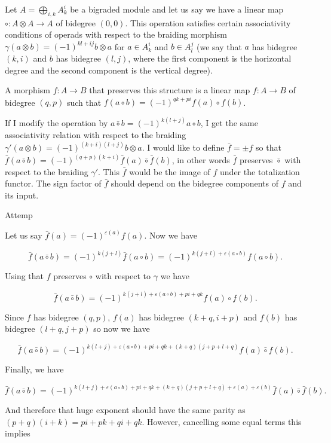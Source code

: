 \documentclass[twoside]{article}
\begin{document}
Let $A=\bigoplus_{i,k} A^i_k$ be a bigraded module and let us say we have a linear map $\circ :A\otimes A\to A$ of bidegree $(0,0)$. This operation satisfies certain associativity conditions of operads with respect to the braiding morphism $\gamma(a\otimes b)=(-1)^{kl+ij}b\otimes a$ for $a\in A^i_k$ and $b\in A^j_l$ (we say that $a$ has bidegree $(k,i)$ and $b$ has bidegree $(l,j)$, where the first component is the horizontal degree and the second component is the vertical degree). 

A morphism $f:A\to B$ that preserves this structure is a linear map $f:A\to B$ of bidegree $(q,p)$ such that $f(a\circ b)=(-1)^{qk+pi}f(a)\circ f(b)$.



If I modify the operation by $a\bar{\circ}b=(-1)^{k(l+j)}a\circ b$, I get the same associativity relation with respect to the braiding $\gamma'(a\otimes b)=(-1)^{(k+i)(l+j)}b\otimes a$. I would like to define $\bar{f}=\pm f$ so that $\bar{f}(a\bar{\circ}b)=(-1)^{(q+p)(k+i)}\bar{f}(a)\bar{\circ}\bar{f}(b)$, in other words $\bar{f}$ preserves $\bar{\circ}$ with respect to the braiding $\gamma'$. This $\bar{f}$ would be the image of $f$ under the totalization functor. The sign factor of $\bar{f}$ should depend on the bidegree components of $f$ and its input.


Attemp

Let us say $\bar{f}(a)=(-1)^{\varepsilon(a)}f(a)$. Now we have

$$\bar{f}(a\bar{\circ} b)=(-1)^{k(j+l)}\bar{f}(a\circ b)=(-1)^{k(j+l)+\varepsilon(a\circ b)}f(a\circ b).$$

Using that $f$ preserves $\circ$ with respect to $\gamma$ we have

$$\bar{f}(a\bar{\circ} b)=(-1)^{k(j+l)+\varepsilon(a\circ b)+pi+qk}f(a)\circ f(b).$$

Since $f$ has bidegree $(q,p)$, $f(a)$ has bidegree $(k+q,i+p)$ and $f(b)$ has bidegree $(l+q,j+p)$ so now we have

$$\bar{f}(a\bar{\circ} b)=(-1)^{k(l+j)+\varepsilon(a\circ b)+pi+qk+(k+q)(j+p+l+q)}f(a)\bar{\circ} f(b).$$

Finally, we have 

$$\bar{f}(a\bar{\circ} b)=(-1)^{k(l+j)+\varepsilon(a\circ b)+pi+qk+(k+q)(j+p+l+q)+\varepsilon(a)+\varepsilon(b)}\bar{f}(a)\bar{\circ} \bar{f}(b).$$

And therefore that huge exponent should have the same parity as $(p+q)(i+k)=pi+pk+qi+qk$. However, cancelling some equal terms this implies
\end{document}
